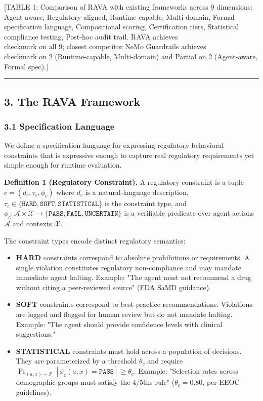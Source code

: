 \documentclass[
]{article}
\providecommand{\tightlist}{%
  \setlength{\itemsep}{0pt}\setlength{\parskip}{0pt}}
\begin{document}
{[}TABLE 1: Comparison of RAVA with existing frameworks across 9 dimensions: Agent-aware, Regulatory-aligned, Runtime-capable, Multi-domain, Formal specification language, Compositional scoring, Certification tiers, Statistical compliance testing, Post-hoc audit trail. RAVA achieves \\checkmark{} on all 9; closest competitor NeMo Guardrails achieves \\checkmark{} on 2 (Runtime-capable, Multi-domain) and Partial on 2 (Agent-aware, Formal spec).{]}

\begin{center}\rule{0.5\linewidth}{0.5pt}\end{center}

\hypertarget{3-the-rava-framework}{%
\subsection{3. The RAVA Framework}\label{3-the-rava-framework}}

\hypertarget{31-specification-language}{%
\subsubsection{3.1 Specification Language}\label{31-specification-language}}

We define a specification language for expressing regulatory behavioral constraints that is expressive enough to capture real regulatory requirements yet simple enough for runtime evaluation.

\textbf{Definition 1 (Regulatory Constraint).} A regulatory constraint is a tuple $c = (d_c, \tau_c, \phi_c)$ where $d_c$ is a natural-language description, $\tau_c \in \{\texttt{HARD}, \texttt{SOFT}, \texttt{STATISTICAL}\}$ is the constraint type, and $\phi_c : \mathcal{A} \times \mathcal{X} \to \{\texttt{PASS}, \texttt{FAIL}, \texttt{UNCERTAIN}\}$ is a verifiable predicate over agent actions $\mathcal{A}$ and contexts $\mathcal{X}$.

The constraint types encode distinct regulatory semantics:

\begin{itemize}
\tightlist
\item
  \textbf{HARD} constraints correspond to absolute prohibitions or requirements. A single violation constitutes regulatory non-compliance and may mandate immediate agent halting. Example: "The agent must not recommend a drug without citing a peer-reviewed source" (FDA SaMD guidance).
\item
  \textbf{SOFT} constraints correspond to best-practice recommendations. Violations are logged and flagged for human review but do not mandate halting. Example: "The agent should provide confidence levels with clinical suggestions."
\item
  \textbf{STATISTICAL} constraints must hold across a population of decisions. They are parameterized by a threshold $\theta_c$ and require $\Pr_{(a,x) \sim \mathcal{P}}[\phi_c(a, x) = \texttt{PASS}] \geq \theta_c$. Example: "Selection rates across demographic groups must satisfy the 4/5ths rule" ($\theta_c = 0.80$, per EEOC guidelines).
\end{itemize}
\end{document}

